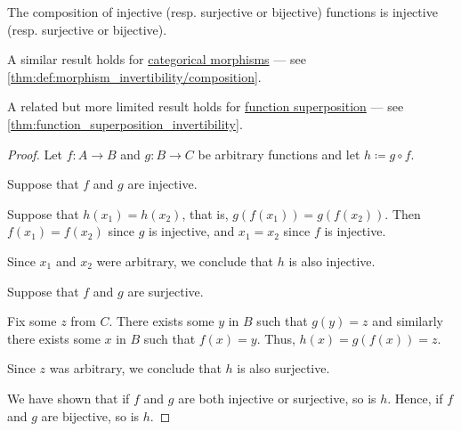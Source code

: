 \begin{proposition}\label{thm:function_composition_invertibility}
  The composition of injective (resp. surjective or bijective) functions is injective (resp. surjective or bijective).
\end{proposition}
\begin{comments}
  \item A similar result holds for \hyperref[def:category/morphisms]{categorical morphisms} --- see \cref{thm:def:morphism_invertibility/composition}.

  \item A related but more limited result holds for \hyperref[def:function_superposition]{function superposition} --- see \cref{thm:function_superposition_invertibility}.
\end{comments}
\begin{proof}
  Let \( f: A \to B \) and \( g: B \to C \) be arbitrary functions and let \( h \coloneqq g \circ f \).

   Suppose that \( f \) and \( g \) are injective.

  Suppose that \( h(x_1) = h(x_2) \), that is, \( g(f(x_1)) = g(f(x_2)) \). Then \( f(x_1) = f(x_2) \) since \( g \) is injective, and \( x_1 = x_2 \) since \( f \) is injective.

  Since \( x_1 \) and \( x_2 \) were arbitrary, we conclude that \( h \) is also injective.

   Suppose that \( f \) and \( g \) are surjective.

  Fix some \( z \) from \( C \). There exists some \( y \) in \( B \) such that \( g(y) = z \) and similarly there exists some \( x \) in \( B \) such that \( f(x) = y \). Thus, \( h(x) = g(f(x)) = z \).

  Since \( z \) was arbitrary, we conclude that \( h \) is also surjective.

   We have shown that if \( f \) and \( g \) are both injective or surjective, so is \( h \). Hence, if \( f \) and \( g \) are bijective, so is \( h \).
\end{proof}

